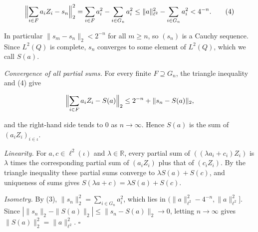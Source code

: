 \documentclass[11pt,a4paper]{article}
\begin{document}
\[\Bigl\|\sum_{i\in F}a_iZ_i-s_n\Bigr\|_2^2=\sum_{i\in F}a_i^2-\sum_{i\in G_n}a_i^2\le\|a\|_{\ell^2}^2-\sum_{i\in G_n}a_i^2<4^{-n}.\qquad(4)\]


In particular \(\|s_m-s_n\|_2<2^{-n}\) for all \(m\ge n\), so \((s_n)\) is a Cauchy sequence. Since \(L^2(Q)\) is complete, \(s_n\) converges to some element of \(L^2(Q)\), which we call \(S(a)\).




\emph{Convergence of all partial sums.} For every finite \(F\supseteq G_n\), the triangle inequality and (4) give


\[\Bigl\|\sum_{i\in F}a_iZ_i-S(a)\Bigr\|_2\le2^{-n}+\|s_n-S(a)\|_2,\]


and the right-hand side tends to \(0\) as \(n\to\infty\). Hence \(S(a)\) is the sum of \((a_iZ_i)_{i\in\iota}\).




\emph{Linearity.} For \(a,c\in\ell^2(\iota)\) and \(\lambda\in\mathbb R\), every partial sum of \(((\lambda a_i+c_i)Z_i)\) is \(\lambda\) times the corresponding partial sum of \((a_iZ_i)\) plus that of \((c_iZ_i)\). By the triangle inequality these partial sums converge to \(\lambda S(a)+S(c)\), and uniqueness of sums gives \(S(\lambda a+c)=\lambda S(a)+S(c)\).




\emph{Isometry.} By (3), \(\|s_n\|_2^2=\sum_{i\in G_n}a_i^2\), which lies in \((\|a\|_{\ell^2}^2-4^{-n},\|a\|_{\ell^2}^2]\). Since \(|\|s_n\|_2-\|S(a)\|_2|\le\|s_n-S(a)\|_2\to0\), letting \(n\to\infty\) gives \(\|S(a)\|_2^2=\|a\|_{\ell^2}^2\). \(\square\)
\end{document}
